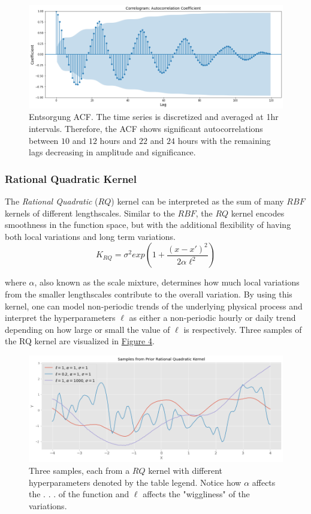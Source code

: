 \begin{figure}[htp]
\centering
\graphicspath{ {./images/} }
\includegraphics[scale=0.49]{images/entsorgung_acf.png}
\caption{Entsorgung ACF. The time series is discretized and averaged at 1hr intervals. Therefore, the ACF shows significant autocorrelations between $10$ and $12$ hours and $22$ and $24$ hours with the remaining lags decreasing in amplitude and significance.}
\end{figure}

\subsubsection{Rational Quadratic Kernel}

The \textit{Rational Quadratic} ($RQ$) kernel can be interpreted as the sum of many $RBF$ kernels of different lengthscales. Similar to the $RBF$, the $RQ$ kernel encodes smoothness in the function space, but with the additional flexibility of having both local variations and long term variations. 
\begin{equation}
    K_{RQ} = \sigma^2 exp(1 + \frac{(x - x')^2}{2\alpha \ell^2})
\end{equation}

where $\alpha$, also known as the scale mixture, determines how much local variations from the smaller lengthscales contribute to the overall variation. By using this kernel, one can model non-periodic trends of the underlying physical process and interpret the hyperparameters $\ell$ as either a non-periodic hourly or daily trend depending on how large or small the value of $\ell$ is respectively. Three samples of the RQ kernel are visualized in \hyperlink{figure.4}{Figure 4}.

\begin{figure}[htp]
\centering
\graphicspath{ {./images/} }
\includegraphics[scale=0.49]{images/samples_rq_prior.png}
\caption{Three samples, each from a $RQ$ kernel with different hyperparameters denoted by the table legend. Notice how $\alpha$ affects the . . . of the function and $\ell$ affects the "wiggliness" of the variations.}
\end{figure}

